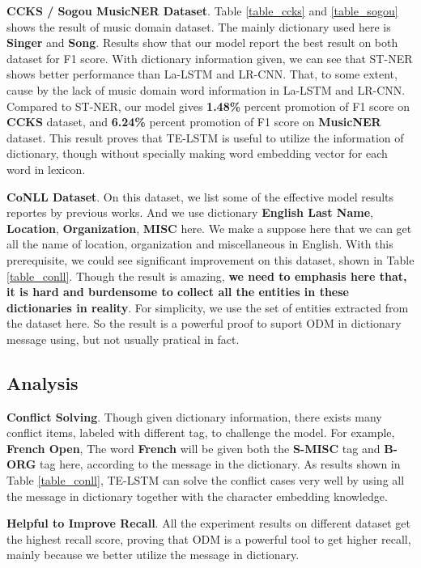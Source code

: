 \documentclass[letterpaper]{article} %
\begin{document}
\textbf{CCKS / Sogou MusicNER Dataset}. Table \ref{table_ccks} and \ref{table_sogou} shows the result of music domain dataset. The mainly dictionary used here is \textbf{Singer} and \textbf{Song}. Results show that our model report the best result on both dataset for F1 score. With dictionary information given, we can see that ST-NER shows better performance than La-LSTM and LR-CNN. That, to some extent, cause by the lack of music domain word information in La-LSTM and LR-CNN. Compared to ST-NER, our model gives \textbf{1.48\%} percent promotion of F1 score on \textbf{CCKS} dataset, and \textbf{6.24\%} percent promotion of F1 score on \textbf{MusicNER} dataset. This result proves that TE-LSTM is useful to utilize the information of dictionary, though without specially making word embedding vector for each word in lexicon.

\textbf{CoNLL Dataset}. On this dataset, we list some of the effective model results reportes by previous works. And we use dictionary \textbf{English Last Name}, \textbf{Location}, \textbf{Organization}, \textbf{MISC} here. We make a suppose here that we can get all the name of location, organization and miscellaneous in English. With this prerequisite, we could see significant improvement on this dataset, shown in Table \ref{table_conll}. Though the result is amazing, \textbf{we need to emphasis here that, it is hard and burdensome to collect all the entities in these dictionaries in reality}. For simplicity, we use the set of entities extracted from the dataset here. So the result is a powerful proof to suport ODM in dictionary message using, but not usually pratical in fact.

\subsection{Analysis}

\textbf{Conflict Solving}. Though given dictionary information, there exists many conflict items, labeled with different tag, to challenge the model. For example, \textbf{French Open}, The word \textbf{French} will be given both the \textbf{S-MISC} tag and \textbf{B-ORG} tag here, according to the message in the dictionary. As results shown in Table \ref{table_conll}, TE-LSTM can solve the conflict cases very well by using all the message in dictionary together with the character embedding knowledge.

\textbf{Helpful to Improve Recall}. All the experiment results on different dataset get the highest recall score, proving that ODM is a powerful tool to get higher recall, mainly because we better utilize the message in dictionary.
\end{document}
